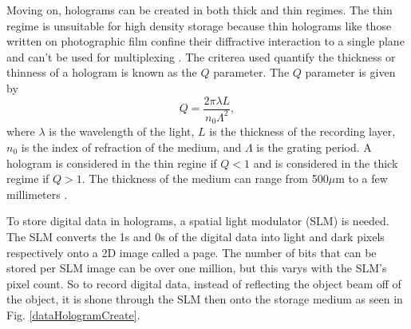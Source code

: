 \documentclass[ notitlepage, numerical, 11pt]{revtex4-1} %
\begin{document}
Moving on, holograms can be created in both thick and thin regimes. The thin regime is unsuitable for high density storage because thin holograms like those written on photographic film confine their diffractive interaction to a single plane and can't be used for multiplexing \cite{HDS}. The criterea used quantify the thickness or thinness of a hologram is known as the $Q$ parameter. The $Q$ parameter is given by 
\begin{equation}
Q = \frac{2\pi\lambda L}{n_0\Lambda^2},
\label{qParameter}
\end{equation}
where $\lambda$ is the wavelength of the light, $L$ is the thickness of the recording layer, $n_0$ is the index of refraction of the medium, and $\Lambda$ is the grating period. A hologram is considered in the thin regine if $Q<1$ and is considered in the thick regime if $Q>1$. The thickness of the medium can range from 500$\mu$m to a few millimeters \cite{HDS}.

To store digital data in holograms, a spatial light modulator (SLM) is needed. The SLM converts the 1s and 0s of the digital data into light and dark pixels respectively onto a 2D image called a page. The number of bits that can be stored per SLM image can be over one million, but this varys with the SLM's pixel count. So to record digital data, instead of reflecting the object beam off of the object, it is shone through the SLM then onto the storage medium as seen in Fig. \ref{dataHologramCreate}. 
\end{document}
